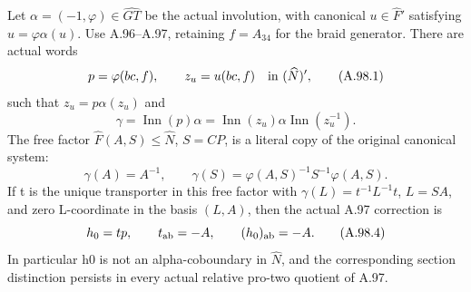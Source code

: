 Let \(\alpha=(-1,\varphi)\in\widehat{GT}\) be the actual involution,
with canonical \(u\in\widehat F'\) satisfying \(u=\varphi\alpha(u)\).
Use A.96--A.97, retaining \(f=A_{34}\) for the braid generator.
There are actual words
\[
 p=\varphi(bc,f),\qquad z_u=u(bc,f)
       \quad\hbox{in }(\widehat N)',
 \tag{A.98.1}
\]
such that \(z_u=p\alpha(z_u)\) and
\[
 \gamma=\operatorname{Inn}(p)\alpha
 =\operatorname{Inn}(z_u)\alpha\operatorname{Inn}(z_u^{-1}).
 \tag{A.98.2}
\]
The free factor \(\widehat F(A,S)\le\widehat N\), \(S=CP\),
is a literal copy of the original canonical system:
\[
 \gamma(A)=A^{-1},\qquad
 \gamma(S)=\varphi(A,S)^{-1}S^{-1}\varphi(A,S).
 \tag{A.98.3}
\]
If t is the unique transporter in this free factor with
\(\gamma(L)=t^{-1}L^{-1}t\), \(L=SA\), and zero L-coordinate
in the basis \((L,A)\), then the actual A.97 correction is
\[
 h_0=tp,\qquad t_{\rm ab}=-A,
       \qquad (h_0)_{\rm ab}=-A.
 \tag{A.98.4}
\]
In particular h0 is not an alpha-coboundary in \(\widehat N\),
and the corresponding section distinction persists in every actual
relative pro-two quotient of A.97.

